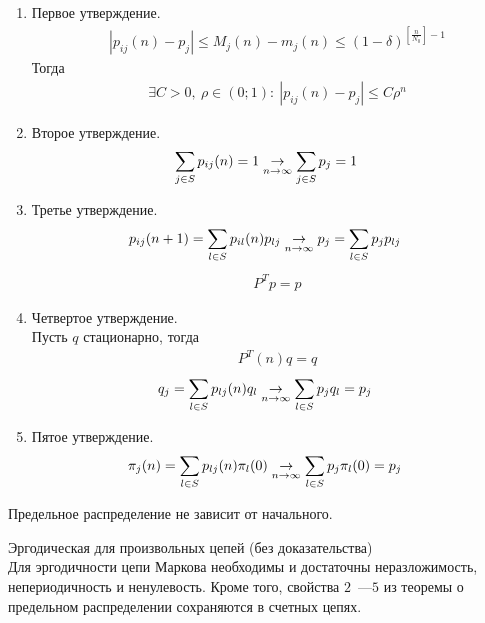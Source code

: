 \begin{Proof}
    \begin{enumerate}
        \item Первое утверждение.
        \begin{align*}
          & \left| p_{ij}(n) - p_j \right| \leq M_j(n) - m_j(n) \leq \left( 1-\delta \right)^{\left[ \frac{n}{N_0} \right] - 1}
        \end{align*}
        Тогда
        \begin{align*}
          & \exists C> 0, \ \rho \in (0;1): \ \left| p_{ij}(n) - p_j \right| \leq C \rho^n
        \end{align*}
        \item Второе утверждение.
        \begin{align*}
          & \sum_{j \in S}p_{ij}(n) = 1 \underset{n \to \infty}\rightarrow\sum_{j \in S}p_{j} = 1
        \end{align*}
        \item Третье утверждение.
        \begin{align*}
          & p_{ij}(n+1) = \sum_{l \in S}p_{il}(n)p_{lj} \underset{n \to \infty}\rightarrow p_j = \sum_{l \in S}p_{j}p_{lj}
        \end{align*}
        \begin{align*}
          & P^Tp=p
        \end{align*}
        \item Четвертое утверждение.
        \\
        Пусть $q$ стационарно, тогда
        \begin{align*}
          & P^T(n)q = q
        \end{align*}
        \begin{align*}
          & q_j = \sum_{l \in S}p_{lj}(n)q_{l} \underset{n \to \infty}\rightarrow \sum_{l \in S}p_{j}q_{l} = p_j
        \end{align*}
        \item Пятое утверждение.
        \begin{align*}
          & \pi_j(n) = \sum_{l \in S}p_{lj}(n)\pi_{l}(0) \underset{n \to \infty}\rightarrow \sum_{l \in S}p_{j}\pi_{l}(0) = p_j
        \end{align*}
    \end{enumerate}
\end{Proof}
\begin{Note}
    Предельное распределение не зависит от начального.
\end{Note}
\begin{theorem} Эргодическая для произвольных цепей (без доказательства)
    \\
    Для эргодичности цепи Маркова необходимы и достаточны неразложимость,
    непериодичность и ненулевость. Кроме того, свойства $2$~---$5$ из теоремы о
    предельном распределении сохраняются в счетных цепях.
\end{theorem}
